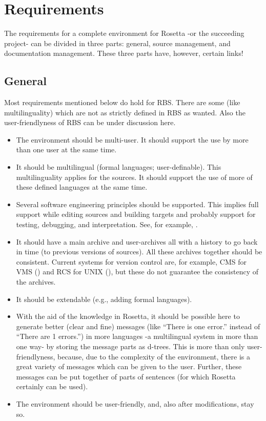 \section{Requirements}
The requirements for a complete environment for Rosetta -or the succeeding 
project- can be divided in three parts: general, source management, and 
documentation management. These three parts have, however, certain links!
\subsection{General}
Most requirements mentioned below do hold for RBS. There are some (like 
multilinguality) which are not as strictly defined in RBS as wanted.
Also the user-friendlyness of RBS can be under discussion here.
 \begin{itemize}
   \item The environment should be multi-user. It should support the use 
         by more than one user at the same time.
   \item It should be multilingual (formal languages; user-definable). This
         multilinguality applies for the sources. It should support the use of 
         more of these defined languages at the same time.
   \item Several software engineering principles should be supported. This
         implies full support while editing sources and building targets and
         probably support for testing, debugging, and interpretation. See, for 
         example, \cite{som:se}.
   \item It should have a main archive and user-archives all with a history to 
         go back in time (to previous versions of sources). All these archives 
         together should be consistent. Current systems for version control 
         are, for example, CMS for VMS (\cite{dec:cms}) and RCS for UNIX 
         (\cite{tich:rcs}), but these do not guarantee the consistency of the 
         archives.
   \item It should be extendable (e.g., adding formal languages).
   \item With the aid of the knowledge in Rosetta, it should be possible here 
         to generate better (clear and fine) messages (like ``There is 
         one error.'' instead of ``There are 1 errors.'') in more languages -a 
         multilingual system in more than one way- by storing the message 
         parts as d-trees. This is more than only user-friendlyness, because, 
         due to the complexity of the environment, there is a great variety of 
         messages which can be given to the user. Further, these messages 
         can be put together of parts of sentences (for which Rosetta certainly 
         can be used).
   \item The environment should be user-friendly, and, also after 
         modifications, stay so.
 \end{itemize}

